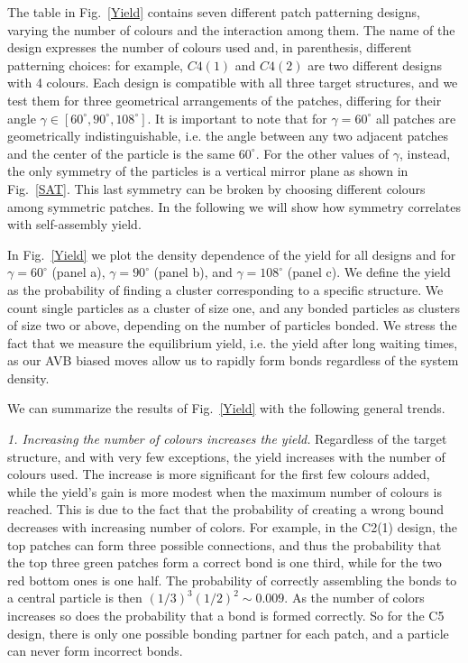 \documentclass[a4paper, amsfonts, amssymb, amsmath, reprint, showkeys, nofootinbib, twoside]{revtex4-1}
\begin{document}
The table in Fig.~\ref{Yield} contains seven different patch patterning designs, varying the number of colours and the interaction among them. The name of the design expresses the number of colours used and, in parenthesis, different patterning choices: for example, $C4(1)$ and $C4(2)$ are two different designs with 4 colours. Each design is compatible with all three target structures, and we test them for three geometrical arrangements of the patches, differing for their angle $\gamma\in [60^\circ, 90^\circ, 108^\circ]$. It is important to note that for $\gamma=60^\circ$ all patches are geometrically indistinguishable, i.e. the angle between any two adjacent patches and the center of the particle is the same $60^\circ$. For the other values of $\gamma$, instead, the only symmetry of the particles is a vertical mirror plane as shown in Fig.~\ref{SAT}. This last symmetry can be broken by choosing different colours among symmetric patches. In the following we will show how symmetry correlates with self-assembly yield.

In Fig.~\ref{Yield} we plot the density dependence of the yield for all designs and for $\gamma=60^\circ$ (panel a), $\gamma=90^\circ$ (panel b), and $\gamma=108^\circ$ (panel c).
We define the yield as the probability of finding a cluster corresponding to a specific structure. We count single particles as a cluster of size one, and any bonded particles as clusters of size two or above, depending on the number of particles bonded.
We stress the fact that we measure the equilibrium yield, i.e. the yield after long waiting times, as our AVB biased moves allow us to rapidly form bonds regardless of the system density.

We can summarize the results of Fig.~\ref{Yield} with the following general trends.


\noindent
\emph{1. Increasing the number of colours increases the yield.} Regardless of the target structure, and with very few exceptions, the yield increases with the number of colours used. The increase is more significant for the first few colours added, while the yield's gain is more modest when the maximum number of colours is reached.
This is due to the fact that the probability of creating a wrong bound decreases with increasing number of colors. For example, in the C2(1) design, the top patches can form three possible connections, and thus the probability that the top three green patches form a correct bond is one third, while for the two red bottom ones is one half. The probability of correctly assembling the bonds to a central particle is then $(1/3)^3 (1/2)^2\sim 0.009$. As the number of colors increases so does the probability that a bond is formed correctly. So for the C5 design, there is only one possible bonding partner for each patch, and a particle can never form incorrect bonds.
\end{document}
